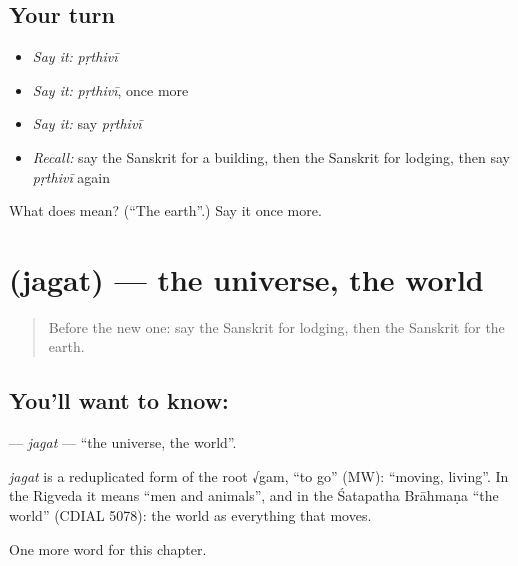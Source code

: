 \subsection*{Your turn}
\begin{itemize}
\raggedright
  \item \emph{Say it:} \emph{pṛthivī}
  \item \emph{Say it:} \emph{pṛthivī}, once more
  \item \emph{Say it:} say \emph{pṛthivī}
  \item \emph{Recall:} say the Sanskrit for a building, then the Sanskrit for lodging, then say \emph{pṛthivī} again
\end{itemize}

\begin{tcolorbox}[breakable,colback=teal!4,colframe=teal!35!black,title={Before you move on}]
What does  mean? (\textquotedblleft{}The earth\textquotedblright{}.) Say it once more.
\end{tcolorbox}
\section[\texorpdfstring{\sk{जगत्} (jagat)}{जगत् (jagat)}]{ (jagat) — the universe, the world}

\label{lesson:SA-C251-jagat}



\begin{quote}
Before the new one: say the Sanskrit for lodging, then the Sanskrit for the earth.
\end{quote}

\subsection*{You'll want to know: }
\textbf{} — \emph{jagat} — \textquotedblleft{}the universe, the world\textquotedblright{}.

\begin{cousinweb}
\emph{jagat} is a reduplicated form of the root √gam, \textquotedblleft{}to go\textquotedblright{} (MW): \textquotedblleft{}moving, living\textquotedblright{}. In the Rigveda it means \textquotedblleft{}men and animals\textquotedblright{}, and in the Śatapatha Brāhmaṇa \textquotedblleft{}the world\textquotedblright{} (CDIAL 5078): the world as everything that moves.
\end{cousinweb}

\begin{grammarlens}[title={What you've built}]
One more word for this chapter.
\end{grammarlens}

